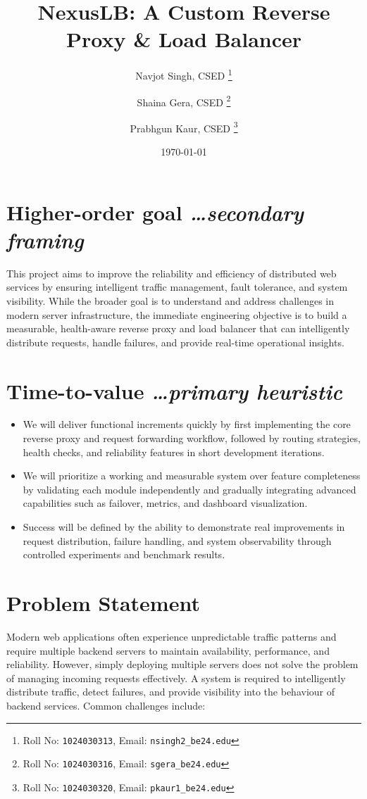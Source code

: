 \documentclass[11pt,a4paper]{article}
\title{NexusLB: A Custom Reverse Proxy \& Load Balancer}
\author{
  Navjot Singh, CSED%
  \thanks{Roll No: \texttt{1024030313}, %
    Email: \texttt{nsingh2\_be24\@thapar.edu}}
  \and 
  Shaina Gera, CSED%
  \thanks{Roll No: \texttt{1024030316}, %
    Email: \texttt{sgera\_be24\@thapar.edu}}
  \and 
  Prabhgun Kaur, CSED%
  \thanks{Roll No: \texttt{1024030320}, %
    Email: \texttt{pkaur1\_be24\@thapar.edu}}
}
\date{\today}
\newcommand{\BvrHint}[1]{%
  {\normalfont\normalsize\itshape\hfill #1}}
\begin{document}
\maketitle

\section{Higher-order goal%
  \BvrHint{\ldots secondary framing}}
This project aims to improve the reliability and efficiency of distributed web services by ensuring intelligent traffic management, fault tolerance, and system visibility. While the broader goal is to understand and address challenges in modern server infrastructure, the immediate engineering objective is to build a measurable, health-aware reverse proxy and load balancer that can intelligently distribute requests, handle failures, and provide real-time operational insights.

\section{Time-to-value %
\BvrHint{\ldots primary heuristic}}
\begin{itemize}[leftmargin=0.7cm]
     \item We will deliver functional increments quickly by first implementing the core reverse proxy and request forwarding workflow, followed by routing strategies, health checks, and reliability features in short development iterations.

    \item We will prioritize a working and measurable system over feature completeness by validating each module independently and gradually integrating advanced capabilities such as failover, metrics, and dashboard visualization.

    \item Success will be defined by the ability to demonstrate real improvements in request distribution, failure handling, and system observability through controlled experiments and benchmark results.
\end{itemize}

\section{Problem Statement}

Modern web applications often experience unpredictable traffic patterns and require multiple backend servers to maintain availability, performance, and reliability. However, simply deploying multiple servers does not solve the problem of managing incoming requests effectively. A system is required to intelligently distribute traffic, detect failures, and provide visibility into the behaviour of backend services. Common challenges include:
\end{document}
